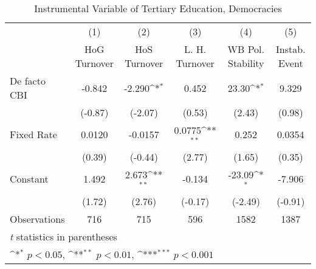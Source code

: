 \begin{table}[htbp]\centering
\def\sym#1{\ifmmode^{#1}\else\(^{#1}\)\fi}
\caption{Instrumental Variable of Tertiary Education, Democracies \label{demIfivs2}}
\begin{tabular}{l*{5}{c}}
\toprule
                                        &\multicolumn{1}{c}{(1)}&\multicolumn{1}{c}{(2)}&\multicolumn{1}{c}{(3)}&\multicolumn{1}{c}{(4)}&\multicolumn{1}{c}{(5)}\\
                                        &\multicolumn{1}{c}{HoG Turnover}&\multicolumn{1}{c}{HoS Turnover}&\multicolumn{1}{c}{L. H. Turnover}&\multicolumn{1}{c}{WB Pol. Stability}&\multicolumn{1}{c}{Instab. Event}\\
\midrule
De facto CBI                            &   -0.842         &   -2.290\sym{*}  &    0.452         &    23.30\sym{*}  &    9.329         \\
                                        &  (-0.87)         &  (-2.07)         &   (0.53)         &   (2.43)         &   (0.98)         \\
\addlinespace
Fixed Rate                              &   0.0120         &  -0.0157         &   0.0775\sym{**} &    0.252         &   0.0354         \\
                                        &   (0.39)         &  (-0.44)         &   (2.77)         &   (1.65)         &   (0.35)         \\
\addlinespace
Constant                                &    1.492         &    2.673\sym{**} &   -0.134         &   -23.09\sym{*}  &   -7.906         \\
                                        &   (1.72)         &   (2.76)         &  (-0.17)         &  (-2.49)         &  (-0.91)         \\
\midrule
Observations                            &      716         &      715         &      596         &     1582         &     1387         \\
\bottomrule
\multicolumn{6}{l}{\footnotesize \textit{t} statistics in parentheses}\\
\multicolumn{6}{l}{\footnotesize \sym{*} \(p<0.05\), \sym{**} \(p<0.01\), \sym{***} \(p<0.001\)}\\
\end{tabular}
\end{table}
